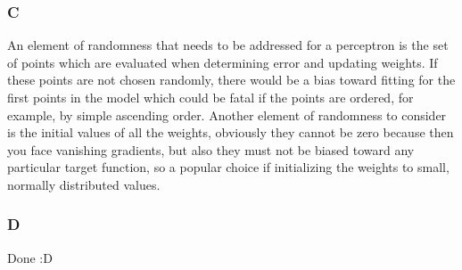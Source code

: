 \documentclass{article}
\begin{document}
\subsubsection{C}
An element of randomness that needs to be addressed for a perceptron is the set of points which are evaluated when determining error and updating weights. If these points are not chosen randomly, there would be a bias toward fitting for the first points in the model which could be fatal if the points are ordered, for example, by simple ascending order. Another element of randomness to consider is the initial values of all the weights, obviously they cannot be zero because then you face vanishing gradients, but also they must not be biased toward any particular target function, so a popular choice if initializing the weights to small, normally distributed values. 
\subsubsection{D}
Done :D
\end{document}
